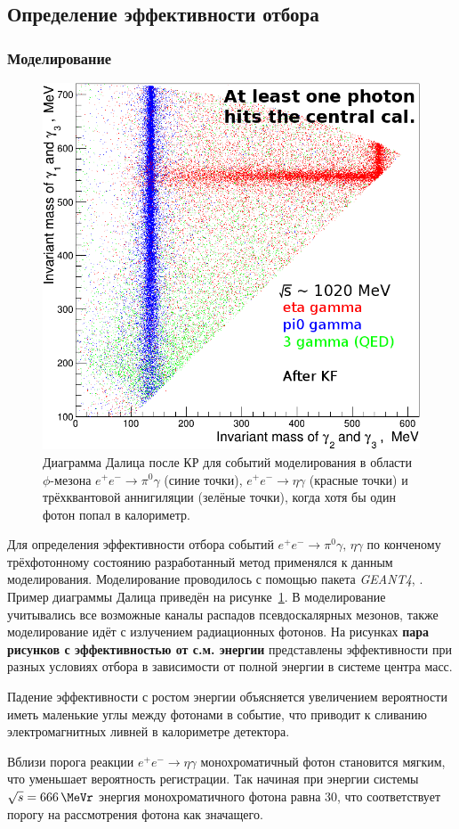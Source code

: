 \subsection{Определение эффективности отбора}



\subsubsection{Моделирование}

\begin{figure}
	\centering
	\includegraphics[width=.5\textwidth]{img/cm12mc.png}
	\caption{Диаграмма Далица после КР 
			для событий моделирования в области $\phi$-мезона
			$e^+ e^- \to \pi^0 \gamma$ (синие точки),
			$e^+ e^- \to \eta \gamma$ (красные точки)
			и трёхквантовой аннигиляции (зелёные точки),
			когда хотя бы один фотон попал в  калориметр.\label{fig:cm12mc}}
\end{figure}

Для определения эффективности отбора событий $e^+ e^- \to \pi^0 \gamma, \, \eta \gamma$ по конченому трёхфотонному состоянию разработанный метод применялся к данным моделирования.
Моделирование проводилось с помощью пакета \emph{GEANT4}, \cite{geant4Allison:2006ve}.
Пример диаграммы Далица приведён на рисунке~\ref{fig:cm12mc}.
В моделирование учитывались все возможные каналы распадов псевдоскалярных мезонов, также моделирование идёт с излучением радиационных фотонов.
На рисунках \textbf{пара рисунков с эффективностью от с.м. энергии} представлены эффективности при разных условиях отбора в зависимости от полной энергии в системе центра масс.

Падение эффективности с ростом энергии объясняется увеличением вероятности иметь маленькие углы между фотонами в событие,
что приводит к сливанию электромагнитных ливней в калориметре детектора.

Вблизи порога реакции $e^+ e^- \to \eta \gamma$ монохроматичный фотон становится мягким, что уменьшает вероятность регистрации.
Так начиная при энергии системы $\sqrt{s} = \SI{666}{\MeVr}$ энергия монохроматичного фотона равна \SI{30}{\MeVr}, что соответствует порогу на рассмотрения фотона как значащего.

